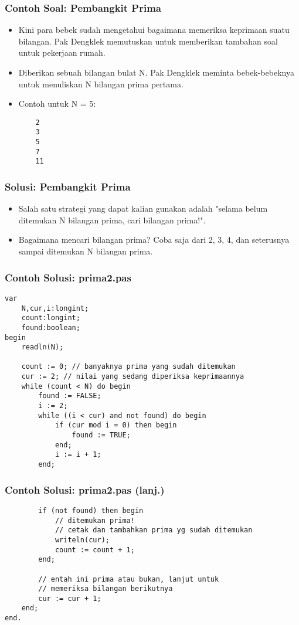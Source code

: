 \documentclass{beamer}
\begin{document}
\begin{frame}[fragile]
\frametitle{Contoh Soal: Pembangkit Prima}
\begin{itemize}
	\item Kini para bebek sudah mengetahui bagaimana memeriksa keprimaan suatu bilangan. Pak Dengklek memutuskan untuk memberikan tambahan soal untuk pekerjaan rumah.
	\item Diberikan sebuah bilangan bulat N. Pak Dengklek meminta bebek-bebeknya untuk menuliskan N bilangan prima pertama.
	\item Contoh untuk N = 5:
	\begin{lstlisting}
	2
	3
	5
	7
	11
	\end{lstlisting}
\end{itemize}
\end{frame}

\begin{frame}
\frametitle{Solusi: Pembangkit Prima}
\begin{itemize}
	\item Salah satu strategi yang dapat kalian gunakan adalah "selama belum ditemukan N bilangan prima, cari bilangan prima!".
	\item Bagaimana mencari bilangan prima? Coba saja dari 2, 3, 4, dan seterusnya sampai ditemukan N bilangan prima.
\end{itemize}
\end{frame}

\begin{frame}[fragile]
\frametitle{Contoh Solusi: prima2.pas}
\begin{lstlisting}
var
    N,cur,i:longint;
    count:longint;
    found:boolean;
begin
    readln(N);

    count := 0; // banyaknya prima yang sudah ditemukan
    cur := 2; // nilai yang sedang diperiksa keprimaannya
    while (count < N) do begin
        found := FALSE;
        i := 2;
        while ((i < cur) and not found) do begin
            if (cur mod i = 0) then begin
                found := TRUE;
            end;
            i := i + 1;
        end;
\end{lstlisting}
\end{frame}

\begin{frame}[fragile]
\frametitle{Contoh Solusi: prima2.pas (lanj.)}
\begin{lstlisting}
        if (not found) then begin
            // ditemukan prima! 
            // cetak dan tambahkan prima yg sudah ditemukan
            writeln(cur);
            count := count + 1;
        end;

        // entah ini prima atau bukan, lanjut untuk 
        // memeriksa bilangan berikutnya
        cur := cur + 1;
    end;
end.
\end{lstlisting}
\end{frame}
\end{document}
